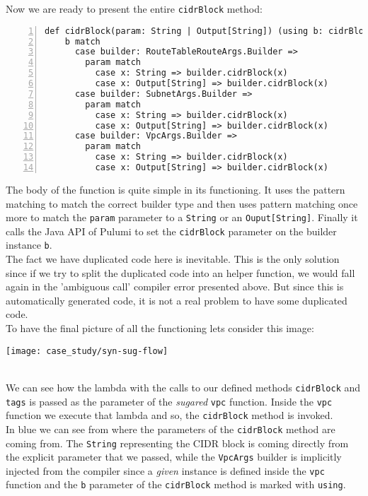 Now we are ready to present the entire \texttt{cidrBlock} method:\\
\begin{minipage}{\linewidth}
\begin{lstlisting}[numbers=left, numberstyle=\tiny, numbersep=-5pt, stepnumber=1, linewidth=420pt]
  def cidrBlock(param: String | Output[String]) (using b: cidrBlockOwners): Unit =
    b match
      case builder: RouteTableRouteArgs.Builder =>
        param match
          case x: String => builder.cidrBlock(x)
          case x: Output[String] => builder.cidrBlock(x)
      case builder: SubnetArgs.Builder =>
        param match
          case x: String => builder.cidrBlock(x)
          case x: Output[String] => builder.cidrBlock(x)
      case builder: VpcArgs.Builder =>
        param match
          case x: String => builder.cidrBlock(x)
          case x: Output[String] => builder.cidrBlock(x)
\end{lstlisting}
\end{minipage}
The body of the function is quite simple in its functioning.
It uses the pattern matching to match the correct builder type and then uses pattern matching once more to match the \texttt{param} parameter to a \texttt{String} or an \texttt{Ouput[String]}.
Finally it calls the Java API of Pulumi to set the \texttt{cidrBlock} parameter on the builder instance \texttt{b}.\\
The fact we have duplicated code here is inevitable.
This is the only solution since if we try to split the duplicated code into an helper function, we would fall again in the 'ambiguous call' compiler error presented above.
But since this is automatically generated code, it is not a real problem to have some duplicated code.\\
\newline
To have the final picture of all the functioning lets consider this image:
\begin{center}
  \hspace*{-3cm}\texttt{[image: case\_study/syn-sug-flow]} 
\end{center}\mbox{}\\
We can see how the lambda with the calls to our defined methods \texttt{cidrBlock} and \texttt{tags} is passed as the  parameter of the \textit{sugared} \texttt{vpc} function.
Inside the \texttt{vpc} function we execute that lambda and so, the \texttt{cidrBlock} method is invoked.\\
In blue we can see from where the parameters of the \texttt{cidrBlock} method are coming from.
The \texttt{String} representing the CIDR block is coming directly from the explicit parameter that we passed,
while the \texttt{VpcArgs} builder is implicitly injected from the compiler since a \textit{given} instance is defined inside the \texttt{vpc} function and the \texttt{b} parameter of the \texttt{cidrBlock} method is marked with \texttt{using}.

